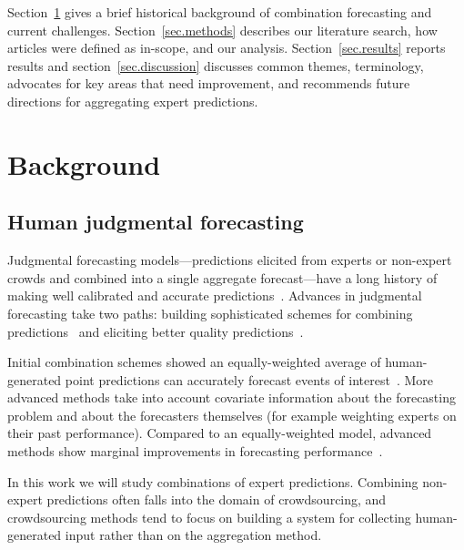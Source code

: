 \documentclass[preprint,authoryear]{elsarticle}
\begin{document}
Section~\ref{background} gives a brief historical background of combination forecasting and current challenges.
Section~\ref{sec.methods} describes our literature search, how articles were defined as in-scope, and our analysis.
Section~\ref{sec.results} reports results and section~\ref{sec.discussion} discusses common themes, terminology, advocates for key areas that need improvement, and recommends future directions for aggregating expert predictions.

\section{Background}
\label{background}

\subsection{Human judgmental forecasting}

Judgmental forecasting models---predictions elicited from experts or non-expert crowds and combined into a single aggregate forecast---have a long history of making well calibrated and accurate predictions~\citep{edmundson1990decomposition,bunn1991interaction,lawrence1992exploring,o1993judgemental}.
Advances in judgmental forecasting take two paths: building sophisticated schemes for combining predictions~\citep{clemen1989combining,clemen1999combining,clemen2008comment} and eliciting better quality predictions~\cite{ayyub2001elicitation,helmer1967analysis}. 

Initial combination schemes showed an equally-weighted average of human-generated point predictions can accurately forecast events of interest~\citep{galton1907vox}.
More advanced methods take into account covariate information about the forecasting problem and about the forecasters themselves (for example weighting experts on their past performance).
Compared to an equally-weighted model, advanced methods show marginal improvements in forecasting performance~\citep{fischer1999combining,mclaughlin1973forecasters,armstrong1985crystal,winkler1971probabilistic,clemen1989combining}.

In this work we will study combinations of expert predictions.
Combining non-expert predictions often falls into the domain of crowdsourcing, and crowdsourcing methods tend to focus on building a system for collecting human-generated input rather than on the aggregation method.
\end{document}
